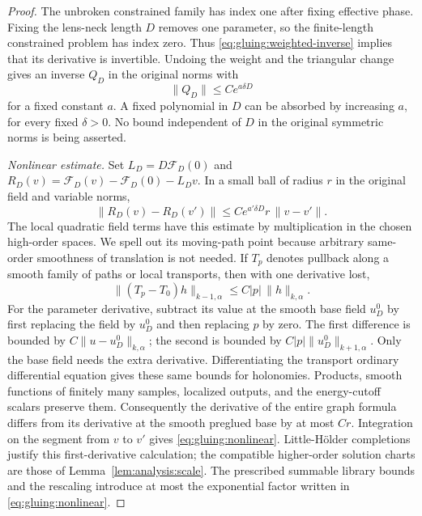 \begin{proof}
The unbroken constrained family has index one after fixing effective
phase.  Fixing the lens-neck length $D$ removes one parameter, so the
finite-length constrained problem has index zero.  Thus
\eqref{eq:gluing:weighted-inverse} implies that its derivative is
invertible.  Undoing the weight and the triangular change gives
an inverse $Q_D$ in the original norms with
\begin{equation}
 \|Q_D\|\le C e^{a\delta D}
 \label{eq:gluing:inverse-loss}
\end{equation}
for a fixed constant $a$.  A fixed polynomial in $D$ can be
absorbed by increasing $a$, for every fixed $\delta>0$.
No bound independent of $D$ in the original symmetric norms is
being asserted.

\emph{Nonlinear estimate.}
Set
$L_D=D\mathcal F_D(0)$ and
$R_D(v)=\mathcal F_D(v)-\mathcal F_D(0)-L_Dv$.
In a small ball of radius $r$ in the original field and variable
norms,
\begin{equation}
 \|R_D(v)-R_D(v')\|
 \le C e^{a'\delta D}r\,\|v-v'\|.
 \label{eq:gluing:nonlinear}
\end{equation}
The local quadratic field terms have this estimate by multiplication
in the chosen high-order spaces.  We spell out its moving-path
point because arbitrary same-order smoothness of translation is
not needed.  If $T_p$ denotes pullback along a smooth family of
paths or local transports, then with one derivative lost,
\[
 \|(T_p-T_0)h\|_{k-1,\alpha}
 \le C|p|\,\|h\|_{k,\alpha}.
\]
For the parameter derivative, subtract its value at the smooth
base field $u_D^0$ by first replacing the field by $u_D^0$ and
then replacing $p$ by zero.  The first difference is bounded by
$C\|u-u_D^0\|_{k,\alpha}$; the second is bounded by
$C|p|\|u_D^0\|_{k+1,\alpha}$.
Only the base field needs the extra derivative.  Differentiating
the transport ordinary differential equation gives these same
bounds for holonomies.  Products, smooth functions of finitely
many samples, localized outputs, and the energy-cutoff scalars
preserve them.  Consequently the derivative of the entire graph
formula differs from its derivative at the smooth preglued base
by at most $Cr$.  Integration on the segment from $v$ to $v'$
gives \eqref{eq:gluing:nonlinear}.  Little-H\"older completions
justify this first-derivative calculation; the compatible
higher-order solution charts are those of
Lemma~\ref{lem:analysis:scale}.  The prescribed summable
library bounds and the rescaling introduce at most the exponential
factor written in \eqref{eq:gluing:nonlinear}.


\end{proof}
